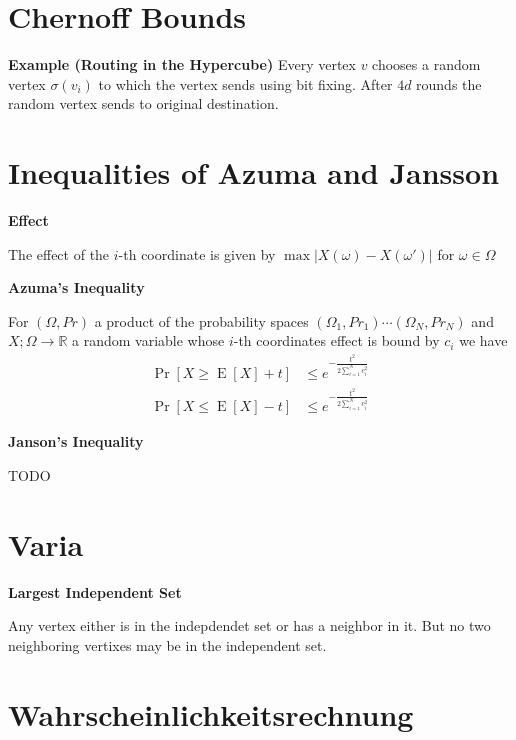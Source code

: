 \documentclass[25pt]{sciposter}
\newcommand{\R}{\mathbb{R}}
\newcommand{\E}{\operatorname{E}}
\newenvironment{method}[1]{\begin{mdframed}[backgroundcolor=blue!10,innertopmargin=15pt, innerbottommargin=15pt,nobreak=true]
		\textbf{#1 }
	}
	{ 
	\end{mdframed}
}
\newenvironment{defn}[1]{\begin{mdframed}[backgroundcolor=PineGreen!20,innertopmargin=15pt, innerbottommargin=15pt, nobreak=true]
		\textbf{#1 }
	}
	{ 
	\end{mdframed}
}
\begin{document}
\begin{multicols}{3}
		
		
		\section{Chernoff Bounds}
		
		\textbf{Example (Routing in the Hypercube)} Every vertex $v$ chooses a random vertex $\sigma(v_i)$ to which the vertex sends using bit fixing. After $4d$ rounds the random vertex sends to original destination. 
		
		\section{Inequalities of Azuma and Jansson}
	
		\begin{defn}{Effect}
The effect of the $i$-th coordinate is given by $\max |X(\omega) - X(\omega')| $ for $\omega \in \Omega$
		\end{defn}
	
			\begin{method}{Azuma's Inequality}
				For $(\Omega, Pr)$ a product of the probability spaces $(\Omega_1, Pr_1) \cdots (\Omega_N, Pr_N)$ and $X;\Omega \to \R$ a random variable whose $i$-th coordinates effect is bound by $c_i$ we have
				\begin{align*}
					\Pr[X\geq \E[X] + t] &\leq e^{-\frac{t^2}{2\sum_{i=1}^{N} c_i ^2}}\\
					\Pr[X\leq \E[X] - t] &\leq e^{-\frac{t^2}{2\sum_{i=1}^{N} c_i ^2}}
				\end{align*}
			\end{method}	
				
			\begin{method}{Janson's Inequality}
TODO
			\end{method}
		
		\section{Varia}
		\begin{defn}{Largest Independent Set}
Any vertex either is in the indepdendet set or has a neighbor in it. But no two neighboring vertixes may be in the independent set.
		\end{defn}
		
		\newpage
		
		\section{Wahrscheinlichkeitsrechnung}
		

\end{multicols}
\end{document}
